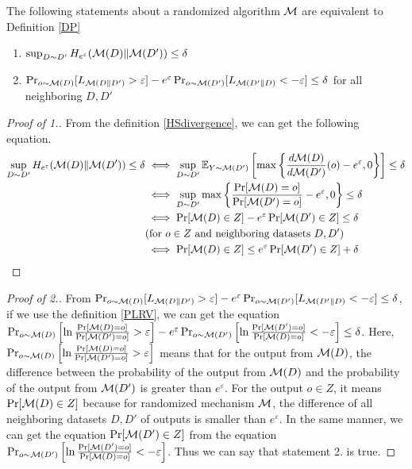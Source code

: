 \documentclass{article}
\begin{document}
\begin{lemma}\label{transfertoed}
    The following statements about a randomized algorithm ${\mathcal{M}}$ are equivalent to Definition \ref{DP}
\begin{enumerate}
    \item $\sup_{D\sim D'} H_{e^\varepsilon}({\mathcal{M}}(D) \Vert {\mathcal{M}}(D')) \le \delta$
    \item $\Pr_{o\sim {\mathcal{M}}(D)}[L_{{\mathcal{M}}(D\Vert D')}>\varepsilon] - e^\varepsilon \Pr_{o\sim {\mathcal{M}}(D')} [L_{{\mathcal{M}}(D'\Vert D)} <-\varepsilon] \le \delta$ for all neighboring $D,D'$ 
\end{enumerate}
\begin{proof}[Proof of 1.]
From the definition \ref{HSdivergence}, we can get the following equation.
\begin{align*} 
    \sup_{D\sim D'}H_{e^\varepsilon}({\mathcal{M}}(D) \Vert {\mathcal{M}}(D')) \le \delta &\iff \sup_{D \sim D'} \mathbb{E}_{Y \sim {\mathcal{M}} (D')}\left[\max\left\{\frac{d{\mathcal{M}}(D)}{d{\mathcal{M}}(D')}(o) - e^{\varepsilon},0\right\}\right] \le \delta \\ 
    &\iff \sup_{D \sim D'}\max\left\{ \frac{\Pr[{\mathcal{M}}(D) =o]}{\Pr[{\mathcal{M}}(D') = o]} - e^\varepsilon,0\right\} \le \delta\\
    &\iff \Pr[{\mathcal{M}}(D) \in Z] -e^\varepsilon\Pr[{\mathcal{M}}(D') \in Z] \le \delta\\
    &\text{(for $o\in Z$ and neighboring datasets $D,D'$)}\\
    &\iff \Pr[{\mathcal{M}}(D) \in Z] \le e^\varepsilon\Pr[{\mathcal{M}}(D') \in Z] + \delta
\end{align*}
\end{proof}
\begin{proof}[Proof of 2.]
From $\Pr_{o\sim {\mathcal{M}}(D)}[L_{{\mathcal{M}}(D\Vert D')}>\varepsilon] - e^\varepsilon \Pr_{o\sim {\mathcal{M}}(D')} [L_{{\mathcal{M}}(D'\Vert D)} <-\varepsilon] \le \delta$, if we use the definition \ref{PLRV}, we can get the equation $\Pr_{o\sim {\mathcal{M}}(D)}\left[\ln \frac{\Pr[{\mathcal{M}}(D) = o]}{\Pr[{\mathcal{M}}(D')=o]}>\varepsilon\right] - e^\varepsilon \Pr_{o\sim {\mathcal{M}}(D')} \left[\ln \frac{\Pr[{\mathcal{M}}(D') = o]}{\Pr[{\mathcal{M}}(D)=o]}<-\varepsilon\right] \le \delta $. Here, $\Pr_{o\sim {\mathcal{M}}(D)}\left[\ln \frac{\Pr[{\mathcal{M}}(D) = o]}{\Pr[{\mathcal{M}}(D')=o]}>\varepsilon\right]$ means that for the output from ${\mathcal{M}}(D)$, the difference between the probability of the output from ${\mathcal{M}}(D)$ and the probability of the output from ${\mathcal{M}}(D')$ is greater than $e^\varepsilon$. For the output $o \in Z$, it means $\Pr[{\mathcal{M}}(D) \in Z]$ because for randomized mechanism ${\mathcal{M}}$, the difference of all neighboring datasets $D, D'$ of outputs is smaller than $e^\varepsilon$. In the same manner, we can get the equation $\Pr[{\mathcal{M}}(D') \in Z]$ from the equation $\Pr_{o\sim {\mathcal{M}}(D')} \left[\ln \frac{\Pr[{\mathcal{M}}(D') = o]}{\Pr[{\mathcal{M}}(D)=o]}<-\varepsilon\right]$. Thus we can say that statement 2. is true.

\end{proof}
\end{lemma}
\end{document}
